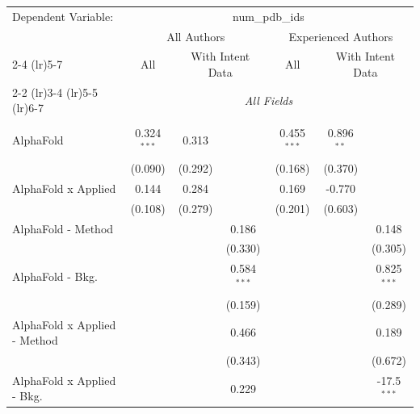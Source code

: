 \begingroup
\centering
\begin{tabular}{lcccccc}
   \tabularnewline \midrule \midrule
   Dependent Variable: & \multicolumn{6}{c}{num\_pdb\_ids}\\
 & \multicolumn{3}{c}{All Authors} & \multicolumn{3}{c}{Experienced Authors} \\
\cmidrule(lr){2-4} \cmidrule(lr){5-7}
 & \multicolumn{1}{c}{All} & \multicolumn{2}{c}{With Intent Data} & \multicolumn{1}{c}{All} & \multicolumn{2}{c}{With Intent Data} \\
\cmidrule(lr){2-2} \cmidrule(lr){3-4} \cmidrule(lr){5-5} \cmidrule(lr){6-7}
 & \multicolumn{6}{c}{\textit{All Fields}} \\ \\
   AlphaFold                      & 0.324$^{***}$ & 0.313         &               & 0.455$^{***}$  & 0.896$^{**}$  &   \\   
                                  & (0.090)       & (0.292)       &               & (0.168)        & (0.370)       &   \\   
   AlphaFold x Applied            & 0.144         & 0.284         &               & 0.169          & -0.770        &   \\   
                                  & (0.108)       & (0.279)       &               & (0.201)        & (0.603)       &   \\   
   AlphaFold - Method             &               &               & 0.186         &                &               & 0.148\\   
                                  &               &               & (0.330)       &                &               & (0.305)\\   
   AlphaFold - Bkg.               &               &               & 0.584$^{***}$ &                &               & 0.825$^{***}$\\   
                                  &               &               & (0.159)       &                &               & (0.289)\\   
   AlphaFold x Applied - Method   &               &               & 0.466         &                &               & 0.189\\   
                                  &               &               & (0.343)       &                &               & (0.672)\\   
   AlphaFold x Applied - Bkg.     &               &               & 0.229         &                &               & -17.5$^{***}$\\   

\end{tabular}
